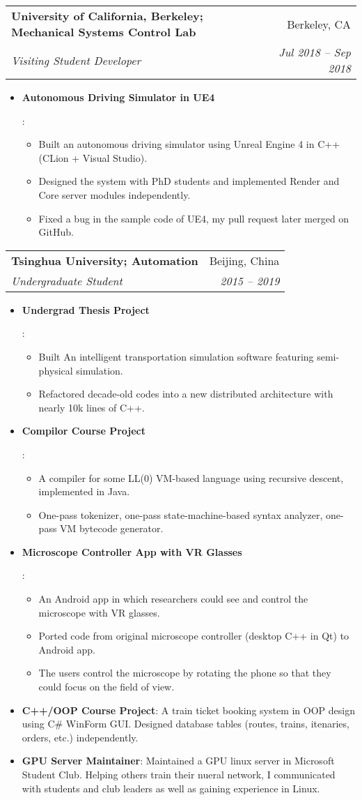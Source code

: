 \documentclass[letterpaper,11pt]{article}
\makeatletter
\newcommand{\resumeItem}[2]{
  \item\small{
    \textbf{#1}{: #2 \vspace{-2pt}}
  }
}
\newcommand{\resumeSubheading}[4]{
  \vspace{-1pt}\item
    \begin{tabular*}{0.97\textwidth}[t]{l@{\extracolsep{\fill}}r}
      \textbf{#1} & #2 \\
      \textit{\small#3} & \textit{\small #4} \\
    \end{tabular*}\vspace{-5pt}
}
\newcommand{\resumeItemListStart}{\begin{itemize}}
\newcommand{\resumeItemListEnd}{\end{itemize}\vspace{-5pt}}
\makeatother
\begin{document}
    \resumeSubheading
      {University of California, Berkeley; Mechanical Systems Control Lab}{Berkeley, CA}
      {Visiting Student Developer}{Jul 2018 -- Sep 2018}
      \resumeItemListStart
        \resumeItem{Autonomous Driving Simulator in UE4}{
          \begin{itemize}
            \item Built an autonomous driving simulator using Unreal Engine 4 in C++ (CLion + Visual Studio).
            \item Designed the system with PhD students and implemented Render and Core server modules independently.
            \item Fixed a bug in the sample code of UE4, my pull request later merged on GitHub.
          \end{itemize}
        }
      \resumeItemListEnd

    \resumeSubheading
      {Tsinghua University; Automation}{Beijing, China}
      {Undergraduate Student}{2015 -- 2019}
      \resumeItemListStart
        \resumeItem{Undergrad Thesis Project}{
          \begin{itemize}
            \item Built An intelligent transportation simulation software featuring semi-physical simulation.
            \item Refactored decade-old codes into a new distributed architecture with nearly 10k lines of C++.
          \end{itemize}
        }
        \resumeItem{Compilor Course Project}{
          \begin{itemize}
            \item A compiler for some LL(0) VM-based language using recursive descent, implemented in Java.
            \item One-pass tokenizer, one-pass state-machine-based syntax analyzer, one-pass VM bytecode generator.
          \end{itemize}
        }
        \resumeItem{Microscope Controller App with VR Glasses}{
          \begin{itemize}
            \item An Android app in which researchers could see and control the microscope with VR glasses.
            \item Ported code from original microscope controller (desktop C++ in Qt) to Android app.
            \item The users control the microscope by rotating the phone so that they could focus on the field of view.
          \end{itemize}
        }
        \resumeItem{C++/OOP Course Project}{
          A train ticket booking system in OOP design using C\# WinForm GUI.
          Designed database tables (routes, trains, itenaries, orders, etc.) independently.
        }
        \resumeItem{GPU Server Maintainer}{
          Maintained a GPU linux server in Microsoft Student Club.
          Helping others train their nueral network, I communicated with students and club leaders as well as gaining experience in Linux.
        }
      \resumeItemListEnd
\end{document}
